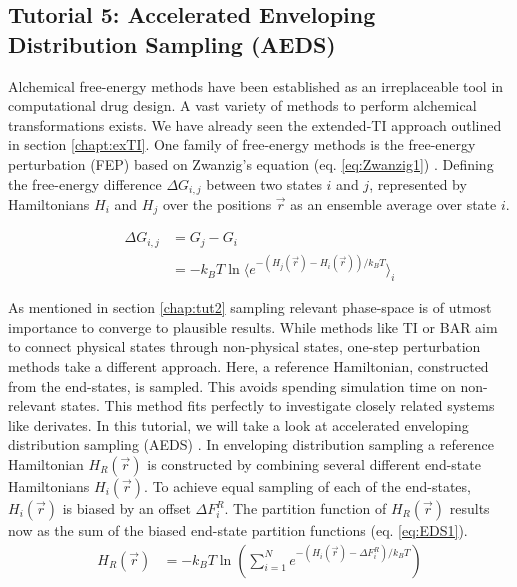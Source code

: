 
\subsection{Tutorial 5: Accelerated Enveloping Distribution Sampling (AEDS)}

Alchemical free-energy methods have been established as an irreplaceable tool in computational drug design. A vast variety of methods to perform alchemical transformations exists. We have already seen the extended-TI approach outlined in section \ref{chapt:exTI}. One family of free-energy methods is the free-energy perturbation (FEP) based on Zwanzig's equation (eq. \ref{eq:Zwanzig1}) \cite{Zwanzig1954}. Defining the free-energy difference $\Delta G_{i,j}$ between two states $i$ and $j$, represented by Hamiltonians $H_i$ and $H_j$ over the positions $\vec{r}$ as an ensemble average over state $i$. 

\begin{equation}
\begin{aligned}
\Delta G_{i,j} & = G_j - G_i \\ & = -k_BT \ln  \Biggl \langle e^{ -(H_j(\vec{r}) - H_i(\vec{r}))/k_BT} \biggr \rangle_i 
\end{aligned}
\label{eq:Zwanzig1}
\end{equation}

As mentioned in section \ref{chap:tut2} sampling relevant phase-space is of utmost importance to converge to plausible results. While methods like TI \cite{kirkwood_TI} or BAR \cite{bar} aim to connect physical states through non-physical states, one-step perturbation methods take a different approach. Here, a reference Hamiltonian, constructed from the end-states, is sampled. This avoids spending simulation time on non-relevant states. This method fits perfectly to investigate closely related systems like derivates. In this tutorial, we will take a look at accelerated enveloping distribution sampling (AEDS) \cite{JP2018,JP2020}. In enveloping distribution sampling a reference Hamiltonian $H_R(\vec{r})$ is constructed by combining several different end-state Hamiltonians $H_i(\vec{r})$. To achieve equal sampling of each of the end-states, $H_i(\vec{r})$ is biased by an offset $\Delta F_{i}^R$. The partition function of $H_R(\vec{r})$ results now as the sum of the biased end-state partition functions (eq. \ref{eq:EDS1}).
\begin{equation}
\begin{aligned}
H_R(\vec{r}) & = -k_BT \ln  \left( \sum_{i=1}^{N} e^{ -(H_i(\vec{r}) - \Delta F_{i}^R)/k_BT} \right) 
\end{aligned}
\label{eq:EDS1}
\end{equation}

